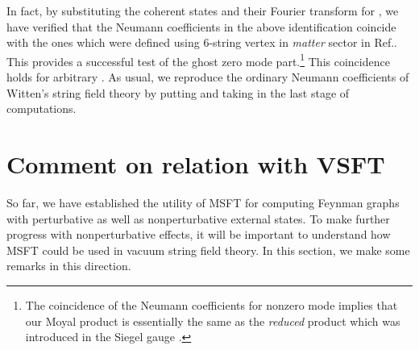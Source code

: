 \documentclass[a4paper,11pt]{article}
\begin{document}
In fact, by substituting the coherent states and their Fourier transform for
\coordHE{}, we have verified that the Neumann coefficients in the
above identification coincide with the ones which were defined using
6-string vertex in \textit{matter} sector in Ref.\cite{BM2}. This provides a
successful test of the ghost zero mode part.\footnote{%
The coincidence of the Neumann coefficients for nonzero mode implies that
our Moyal \myHighlight{$\star $}\coordHE{} product is essentially the same as the \textit{reduced}
product which was introduced in the Siegel gauge \cite{IK,Oku}.} This
coincidence holds for arbitrary \coordHE{}. As usual, we
reproduce the ordinary Neumann coefficients of Witten's string field theory
by putting \coordHE{} and taking \coordHE{}
in the last stage of computations.

\section{Comment on relation with VSFT}

So far, we have established the utility of MSFT for computing Feynman graphs
with perturbative as well as nonperturbative external states. To make
further progress with nonperturbative effects, it will be important to
understand how MSFT could be used in vacuum string field theory. In this
section, we make some remarks in this direction.
\end{document}
